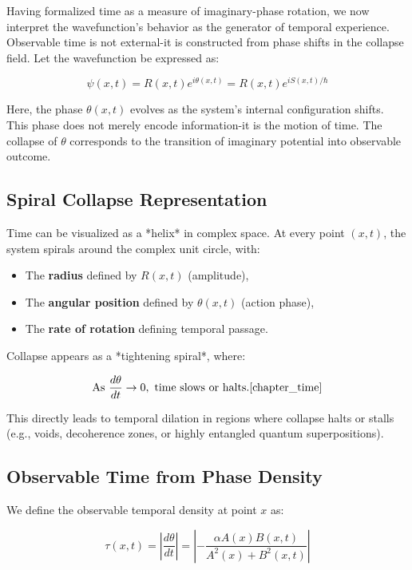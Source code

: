 Having formalized time as a measure of imaginary-phase rotation, we now interpret the wavefunction’s behavior as the generator of temporal experience. \cite{chapter_time} Observable time is not external-it is constructed from phase shifts in the collapse field. \cite{chapter_time} Let the wavefunction be expressed as:

\[
\psi(x,t) = R(x,t) e^{i \theta(x,t)} = R(x,t) e^{i S(x,t)/\hbar}
\]

Here, the phase $\theta(x,t)$ evolves as the system’s internal configuration shifts. \cite{chapter_time} This phase does not merely encode information-it is the motion of time. \cite{chapter_time} The collapse of $\theta$ corresponds to the transition of imaginary potential into observable outcome. \cite{chapter_time} \subsection*{Spiral Collapse Representation}

Time can be visualized as a *helix* in complex space. \cite{chapter_time} At every point $(x,t)$, the system spirals around the complex unit circle, with:

\begin{itemize}
  \item The \textbf{radius} defined by $R(x,t)$ (amplitude),
  \item The \textbf{angular position} defined by $\theta(x,t)$ (action phase),
  \item The \textbf{rate of rotation} defining temporal passage. \cite{chapter_time} \end{itemize}

Collapse appears as a *tightening spiral*, where:

\[
\text{As } \frac{d\theta}{dt} \rightarrow 0, \text{ time slows or halts}. \cite{chapter_time} \]

This directly leads to temporal dilation in regions where collapse halts or stalls (e.g., voids, decoherence zones, or highly entangled quantum superpositions). \cite{chapter_time} \subsection*{Observable Time from Phase Density}

We define the observable temporal density at point $x$ as:

\[
\tau(x,t) = \left| \frac{d\theta}{dt} \right| = \left| -\frac{\alpha A(x) B(x,t)}{A^2(x) + B^2(x,t)} \right|
\]

